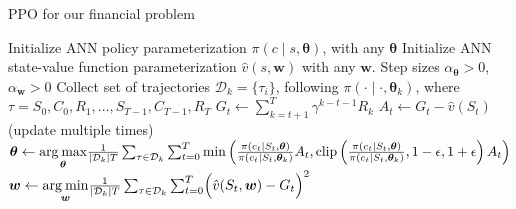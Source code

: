 \documentclass[11pt]{article}
\begin{document}
\begin{algorithm}[H]
\caption{PPO for our financial problem}
\begin{algorithmic}[1]
\State Initialize ANN policy parameterization 
\(\pi\left(c\middle|s, \bm{\theta}\right)\), with any \(\bm{\theta}\)
\State Initialize ANN state-value function parameterization
\(\hat{v}(s,\bm{w})\) with any \(\bm{w}\).
\State Step sizes \(\alpha_{\bm{\theta}}>0\), \(\alpha_{\bm{w}}>0\)
    \State Collect set of trajectories \(\mathcal{D}_k=\{\tau_i\}\), 
    following \(\pi\left(\cdot\middle|\cdot, \bm{\theta}_k\right)\), where 
    \(\tau = S_0, C_0, R_1, ..., S_{T-1}, C_{T-1}, R_T\)
        \State \(G_t \gets \sum_{k=t+1}^{T} \gamma^{k-t-1}R_k\)
        \State \(A_t \gets G_t - \hat{v}(S_t)\)
    \EndFor
    \Loop \hspace{0.3mm} (update multiple times)
    \State \(\bm{\theta} \gets \underset{\bm{\theta}}{\text{arg\:max}}
    \frac{1}{|\mathcal{D}_k|T}\sum_{\tau\in\mathcal{D}_k}^{} \sum_{t=0}^{T} 
    \min{\left(
            \frac{\pi\left(c_t\middle|S_t, \bm{\theta}\right)}
            {\pi\left(c_t\middle|S_t, \bm{\theta}_k\right)}A_t,
            \text{clip}\left(
                \frac{\pi\left(c_t\middle|S_t, \bm{\theta}\right)}
                {\pi\left(c_t\middle|S_t, \bm{\theta}_k\right)},
                1-\epsilon, 1+\epsilon
            \right)A_t
    \right)}\)
    \State \(\bm{w} \gets \underset{\bm{w}}{\text{arg\:min}}
    \frac{1}{|\mathcal{D}_k|T}\sum_{\tau\in\mathcal{D}_k}^{} \sum_{t=0}^{T} 
    \Bigl(\hat{v}(S_t, \bm{w})-G_t\Bigr)^2\)
    \EndLoop
\EndFor
\end{algorithmic}
\end{algorithm}
\end{document}
